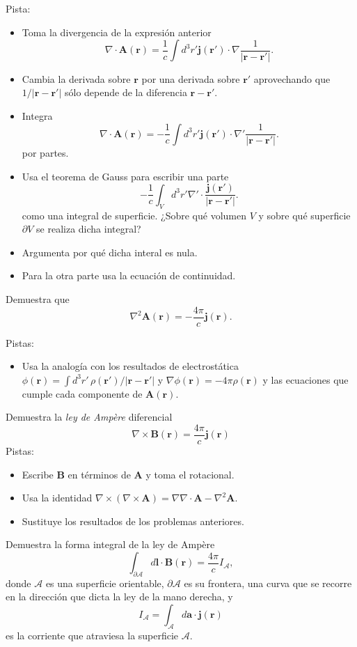 \documentclass{exam}
\begin{document}
\begin{questions}
    Pista:
    \begin{itemize}
    \item Toma la divergencia de la expresión anterior
      $$ \nabla\cdot\bm A(\bm r)=\frac{1}{c}\int d^3r' \bm j(\bm r')\cdot\nabla\frac{1}{|\bm
        r-\bm r'|}.
      $$
    \item Cambia la derivada sobre $\bm r$ por una derivada sobre $\bm
      r'$ aprovechando que $1/|\bm r-\bm r'|$ sólo depende de la
      diferencia $\bm r-\bm r'$.
    \item Integra
      $$ \nabla\cdot\bm A(\bm r)=-\frac{1}{c}\int d^3r' \bm j(\bm
        r')\cdot\nabla'\frac{1}{|\bm r-\bm r'|}.
      $$
      por partes.
    \item Usa el teorema de Gauss para escribir una parte
      $$-\frac{1}{c}\int_V d^3r' \nabla'\cdot \frac{\bm j(\bm
        r')}{|\bm r-\bm r'|}.
      $$
      como una integral de superficie. ¿Sobre qué volumen $V$ y sobre
      qué superficie $\partial V$ se realiza dicha integral?
    \item Argumenta por qué dicha interal es nula.
    \item Para la otra parte usa la ecuación de continuidad.
    \end{itemize}
  \question Demuestra que
    $$\nabla^2\bm A(\bm r)=-\frac{4\pi}{c}\bm j(\bm r).$$

    Pistas:
    \begin{itemize}
    \item Usa la analogía con los resultados de electrostática
      $\phi(\bm r)=\int d^3r'\,\rho(\bm r')/|\bm r-\bm r'|$ y
      $\nabla\phi(\bm r)=-4\pi\rho(\bm r)$ y las ecuaciones que cumple
      cada componente de $\bm A(\bm r)$.
    \end{itemize}
  \question Demuestra la {\em ley de Ampère} diferencial
    $$\nabla\times\bm B(\bm r)=\frac{4\pi}{c}\bm j(\bm r)$$
    Pistas:
    \begin{itemize}
    \item Escribe $\bm B$ en términos de $\bm A$ y toma el rotacional.
    \item Usa la identidad $\nabla\times(\nabla\times \bm
      A)=\nabla\nabla\cdot\bm A-\nabla^2\bm A$.
    \item Sustituye los resultados de los problemas anteriores.
    \end{itemize}
  \question Demuestra la forma integral de la ley de Ampère
    $$
    \int_{\partial \mathcal A} d\bm l\cdot\bm B(\bm
    r)=\frac{4\pi}{c}I_{\mathcal A},
    $$
    donde $\mathcal A$ es una superficie orientable, $\partial
    \mathcal A$ es su frontera, una curva que se recorre en la
    dirección que dicta la ley de la mano derecha, y
    $$
    I_{\mathcal A}=\int_{\mathcal A}d\bm a\cdot\bm j(\bm r)
    $$
    es la corriente que atraviesa la superficie $\mathcal A$.


\end{questions}
\end{document}
